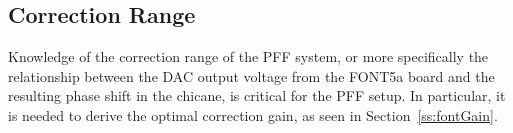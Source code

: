 
%
%
%



\subsection{Correction Range}
\label{ss:corrRange}

Knowledge of the correction range of the PFF system, or more specifically the relationship between the DAC output voltage from the FONT5a board and the resulting phase shift in the chicane, is critical for the PFF setup. In particular, it is needed to derive the optimal
correction gain, as seen in Section~\ref{ss:fontGain}.


